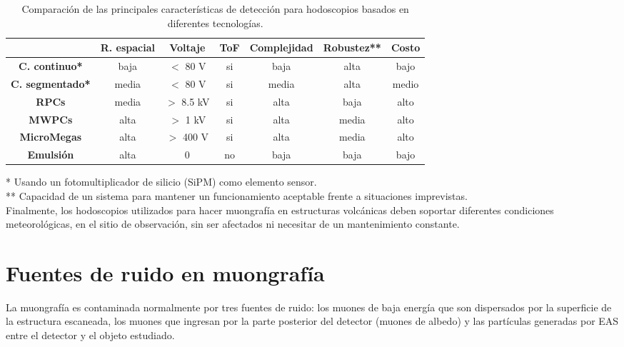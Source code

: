 \begin{table}[ht]
\centering
  \caption{Comparación de las principales características de detección para hodoscopios basados en diferentes tecnologías.}
  \begin{tabular}{ | c | c | c |  c | c |  c | c |}
    \hline
   & \textbf{R. espacial} & \textbf{Voltaje} & \textbf{ToF}  & \textbf{Complejidad} & \textbf{Robustez**} & \textbf{Costo} \\ \hline
    \textbf{C. continuo*}   & baja  & $<$ 80 V &si  & baja  & alta  & bajo \\ \hline
    \textbf{C. segmentado*} & media & $<$ 80 V &si   & media & alta  & medio \\ \hline
    \textbf{RPCs}            & media & $>$ 8.5 kV &si   & alta  & baja &  alto \\ \hline
    \textbf{MWPCs}            & alta  & $>$ 1 kV &si   & alta  & media & alto \\ \hline
    \textbf{MicroMegas}      & alta  & $>$ 400 V &si   & alta  & media & alto \\ \hline
    \textbf{Emulsión}        & alta  & 0 & no   & baja  & baja  & bajo \\
    \hline
  \end{tabular}
  \label{tab1}
\end{table}

* Usando un fotomultiplicador de silicio (SiPM) como elemento sensor.\\
** Capacidad de un sistema para mantener un funcionamiento aceptable frente a situaciones imprevistas.\\


Finalmente, los hodoscopios utilizados para hacer muongrafía en estructuras volcánicas deben soportar diferentes condiciones meteorológicas, en el sitio de observación, sin ser afectados ni necesitar de un mantenimiento constante.


\section{Fuentes de ruido en muongrafía}
La muongrafía es contaminada normalmente por tres fuentes de ruido: los muones de baja energía que son dispersados por la superficie de la estructura escaneada, los muones que ingresan por la parte posterior del detector (muones de albedo) y las partículas generadas por EAS entre el detector y el objeto estudiado.

